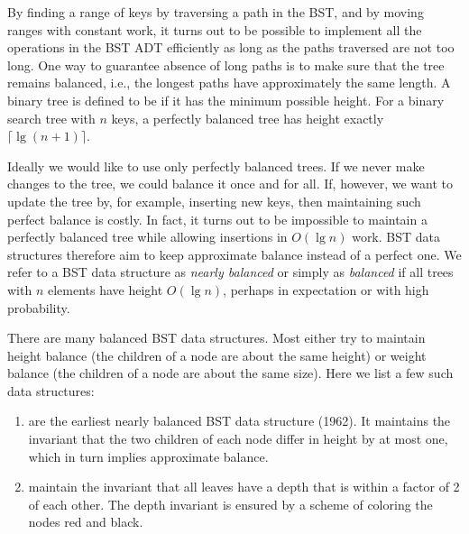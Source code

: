 \begin{chapter}[Binary Search Trees]

By finding a range of keys by traversing a path in the BST, and by
moving ranges with constant work, it turns out to be possible to
implement all the operations in the BST ADT efficiently as long as the
paths traversed are not too long.
%
One way to guarantee absence of long paths is to make sure that the
tree remains balanced, i.e., the longest paths have approximately
the same length.
%
A binary tree is defined to be  if it has the
minimum possible height.  
%
For a binary search tree with $n$ keys, a perfectly balanced tree has
height exactly $\lceil \lg (n + 1) \rceil$.

Ideally we would like to use only perfectly balanced trees.  
%
If we never make changes to the tree, we could balance it
once and for all.
%
If, however, we want to update the tree by, for example, inserting new
keys, then maintaining such perfect balance is costly.  
%
In fact, it turns out to be impossible to maintain a perfectly
balanced tree while allowing insertions in $O(\lg n)$ work.  
%
BST data structures therefore aim to keep approximate balance instead
of a perfect one.  We refer to a BST data structure as {\em nearly
  balanced} or simply as {\em balanced} if all trees with $n$ elements
have height $O(\lg n)$, perhaps in expectation or with high
probability.

There are many balanced BST data structures.  Most either try to
maintain height balance (the children of a node are about the same
height) or weight balance (the children of a node are about the same
size).  Here we list a few such data structures:

\begin{enumerate}
\item {} are the earliest nearly balanced BST data
  structure (1962).  It maintains the invariant that the two children
  of each node differ in height by at most one, which in turn implies
  approximate balance.

\item {} maintain the invariant that all leaves
  have a depth that is within a factor of 2 of each other.  The depth
  invariant is ensured by a scheme of coloring the nodes red and
  black.


\end{enumerate}
\end{chapter}
